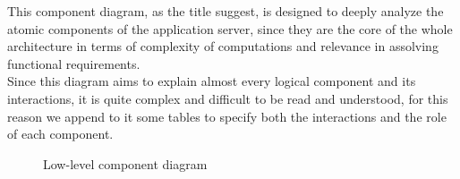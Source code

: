 This component diagram, as the title suggest, is designed to deeply analyze the atomic components of the application server, since they are the core of the whole architecture in terms of complexity of computations and relevance in assolving functional requirements. \\
Since this diagram aims to explain almost every logical component and its interactions, it is quite complex and difficult to be read and understood, for this reason we append to it some tables to specify both the interactions and the role of each component. \\



\begin{figure} 
\begin{center}

\caption{Low-level component diagram} 
\label{fig:llcomponentdiagram} 


\end{center}
\end{figure} 
